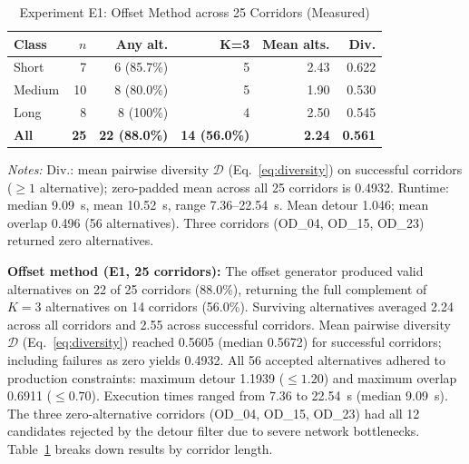 \documentclass[11pt,conference]{IEEEtran}
\begin{document}
\begin{table}[t]
\caption{Experiment E1: Offset Method across 25 Corridors (Measured)}
\label{tab:expE_offset}
\centering
\footnotesize
\setlength{\tabcolsep}{2pt}
\renewcommand{\arraystretch}{1.08}
\begin{tabular}{@{}lrrrrr@{}}
\hline
\textbf{Class} & \textbf{$n$} & \textbf{Any alt.} & \textbf{K=3} & \textbf{Mean alts.} & \textbf{Div.} \\
\hline
Short           & 7  & 6 (85.7\%) & 5 & 2.43 & 0.622 \\
Medium          & 10 & 8 (80.0\%) & 5 & 1.90 & 0.530 \\
Long            & 8  & 8 (100\%)  & 4 & 2.50 & 0.545 \\
\hline
\textbf{All}   & \textbf{25} & \textbf{22 (88.0\%)} & \textbf{14 (56.0\%)} & \textbf{2.24} & \textbf{0.561} \\
\hline
\end{tabular}
\vspace{2pt}
\begin{minipage}{\columnwidth}
\scriptsize
\textit{Notes:} Div.: mean pairwise diversity $\mathcal{D}$ (Eq.~\ref{eq:diversity}) on successful corridors ($\ge 1$ alternative); zero-padded mean across all 25 corridors is 0.4932. Runtime: median 9.09~s, mean 10.52~s, range 7.36--22.54~s. Mean detour 1.046; mean overlap 0.496 (56 alternatives). Three corridors (OD\_04, OD\_15, OD\_23) returned zero alternatives.
\end{minipage}
\end{table}

\noindent\textbf{Offset method (E1, 25 corridors):}
The offset generator produced valid alternatives on 22 of 25 corridors (88.0\%), returning the full complement of $K=3$ alternatives on 14 corridors (56.0\%).
Surviving alternatives averaged 2.24 across all corridors and 2.55 across successful corridors.
Mean pairwise diversity $\mathcal{D}$ (Eq.~\ref{eq:diversity}) reached 0.5605 (median 0.5672) for successful corridors; including failures as zero yields 0.4932.
All 56 accepted alternatives adhered to production constraints: maximum detour 1.1939 ($\le 1.20$) and maximum overlap 0.6911 ($\le 0.70$).
Execution times ranged from 7.36 to 22.54~s (median 9.09~s).
The three zero-alternative corridors (OD\_04, OD\_15, OD\_23) had all 12 candidates rejected by the detour filter due to severe network bottlenecks.
Table~\ref{tab:expE_offset} breaks down results by corridor length.
\end{document}
